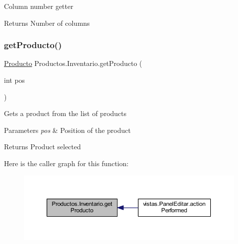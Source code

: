 Column number getter \begin{DoxyReturn}{Returns}
Number of columns 
\end{DoxyReturn}
\mbox{\label{class_productos_1_1_inventario_adedc7e3eac62bbbc20bff33ffa9503f0}} 
\subsubsection{\texorpdfstring{get\+Producto()}{getProducto()}}
{\footnotesize\ttfamily \mbox{\hyperlink{class_productos_1_1_producto}{Producto}} Productos.\+Inventario.\+get\+Producto (\begin{DoxyParamCaption}\item[{int}]{pos }\end{DoxyParamCaption})}

Gets a product from the list of products 
\begin{DoxyParams}{Parameters}
{\em pos} & Position of the product \\
\hline
\end{DoxyParams}
\begin{DoxyReturn}{Returns}
Product selected 
\end{DoxyReturn}
Here is the caller graph for this function\+:
\nopagebreak
\begin{figure}[H]
\begin{center}
\leavevmode
\includegraphics[width=350pt]{class_productos_1_1_inventario_adedc7e3eac62bbbc20bff33ffa9503f0_icgraph}
\end{center}
\end{figure}
\mbox{\label{class_productos_1_1_inventario_ae299062aacb44852791e08833810e8bf}} 
